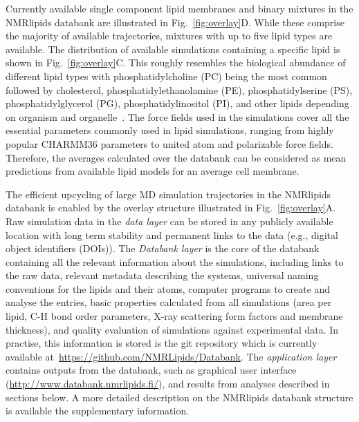 \documentclass[fleqn,10pt]{wlscirep}
\begin{document}
Currently available single component lipid membranes and binary mixtures in the NMRlipids databank are illustrated in Fig.~\ref{fig:overlay}D. While these comprise the majority of available trajectories, mixtures with up to five lipid types are available. The distribution of available simulations containing a specific lipid is shown in Fig.~\ref{fig:overlay}C. This roughly resembles the biological abundance of different lipid types with phosphatidylcholine (PC) being the most common followed by cholesterol, phosphatidylethanolamine (PE), phosphatidylserine (PS), phosphatidylglycerol (PG), phosphatidylinositol (PI), and other lipids depending on organism and organelle~\cite{vanmeer08}. The force fields used in the simulations cover all the essential parameters commonly used in lipid simulations, ranging from highly popular CHARMM36 parameters to united atom and polarizable force fields. Therefore, the averages calculated over the databank can be considered as mean predictions from available lipid models for an average cell membrane.

The efficient upcycling of large MD simulation trajectories in the NMRlipids databank is enabled by the overlay structure illustrated in Fig.~\ref{fig:overlay}A. Raw simulation data in the {\it data layer} can be stored in any publicly available location with long term stability and permanent links to the data (e.g., digital object identifiers (DOIs)). The {\it Databank layer} is the core of the databank containing all the relevant information about the simulations, including links to the raw data, relevant metadata describing the systems, universal naming conventions for the lipids and their atoms, computer programs to create and analyse the entries, basic properties calculated from all simulations (area per lipid, C-H bond order parameters, X-ray scattering form factors and membrane thickness), and quality evaluation of simulations against experimental data. In practise, this information is stored is the git repository which is currently available at~\url{https://github.com/NMRLipids/Databank}. The {\it application layer} contains outputs from the databank, such as graphical user interface (\url{http://www.databank.nmrlipids.fi/}), and results from analyses described in sections below. A more detailed description on the NMRlipids databank structure is available the supplementary information. 
\end{document}
